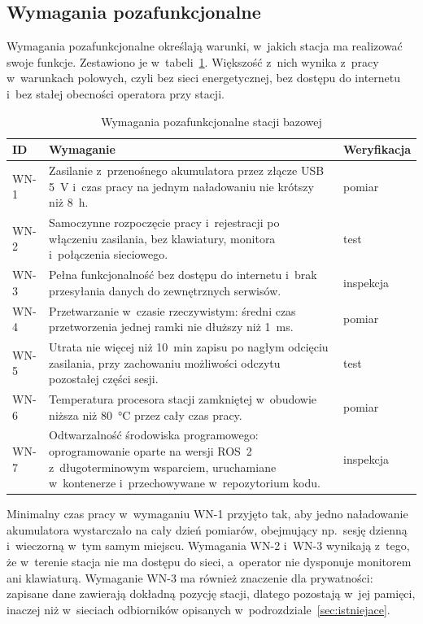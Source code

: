 \subsection{Wymagania pozafunkcjonalne}
\label{sec:wymagania_pozafunkcjonalne}

Wymagania pozafunkcjonalne określają warunki, w~jakich stacja ma realizować swoje funkcje. Zestawiono je w~tabeli~\ref{tab:wn}. Większość z~nich wynika z~pracy w~warunkach polowych, czyli bez sieci energetycznej, bez dostępu do internetu i~bez stałej obecności operatora przy stacji.

\begin{table}[!htb]
  \centering
  \caption{Wymagania pozafunkcjonalne stacji bazowej}
  \label{tab:wn}
  \small
  \begin{tabular}{>{\raggedright}p{1.2cm} >{\raggedright}p{11.4cm} >{\raggedright\arraybackslash}p{1.9cm}}
    \toprule
    ID & Wymaganie & Weryfikacja \\
    \midrule
    WN-1 & Zasilanie z~przenośnego akumulatora przez złącze USB \SI{5}{V} i~czas pracy na jednym naładowaniu nie krótszy niż \SI{8}{h}. & pomiar \\
    WN-2 & Samoczynne rozpoczęcie pracy i~rejestracji po włączeniu zasilania, bez klawiatury, monitora i~połączenia sieciowego. & test \\
    WN-3 & Pełna funkcjonalność bez dostępu do internetu i~brak przesyłania danych do zewnętrznych serwisów. & inspekcja \\
    WN-4 & Przetwarzanie w~czasie rzeczywistym: średni czas przetworzenia jednej ramki nie dłuższy niż \SI{1}{ms}. & pomiar \\
    WN-5 & Utrata nie więcej niż \SI{10}{min} zapisu po nagłym odcięciu zasilania, przy zachowaniu możliwości odczytu pozostałej części sesji. & test \\
    WN-6 & Temperatura procesora stacji zamkniętej w~obudowie niższa niż \SI{80}{\degreeCelsius} przez cały czas pracy. & pomiar \\
    WN-7 & Odtwarzalność środowiska programowego: oprogramowanie oparte na wersji ROS~2 z~długoterminowym wsparciem, uruchamiane w~kontenerze i~przechowywane w~repozytorium kodu. & inspekcja \\
    \bottomrule
  \end{tabular}
\end{table}

Minimalny czas pracy w~wymaganiu WN-1 przyjęto tak, aby jedno naładowanie akumulatora wystarczało na cały dzień pomiarów, obejmujący np.\ sesję dzienną i~wieczorną w~tym samym miejscu. Wymagania WN-2 i~WN-3 wynikają z~tego, że w~terenie stacja nie ma dostępu do sieci, a~operator nie dysponuje monitorem ani klawiaturą. Wymaganie WN-3 ma również znaczenie dla prywatności: zapisane dane zawierają dokładną pozycję stacji, dlatego pozostają w~jej pamięci, inaczej niż w~sieciach odbiorników opisanych w~podrozdziale~\ref{sec:istniejace}.

